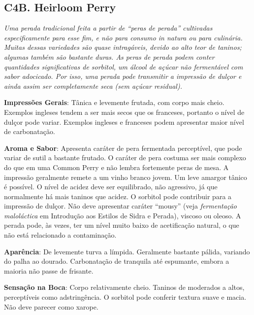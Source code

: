 \subsection*{C4B. Heirloom Perry}

\textit{Uma perada tradicional feita a partir de “peras de perada” cultivadas especificamente para esse fim, e não para consumo \textit{in natura} ou para culinária. Muitas dessas variedades são quase intragáveis, devido ao alto teor de taninos; algumas também são bastante duras. As peras de perada podem conter quantidades significativas de sorbitol, um álcool de açúcar não fermentável com sabor adocicado. Por isso, uma perada pode transmitir a impressão de dulçor e ainda assim ser completamente seca (sem açúcar residual).}

\textbf{Impressões Gerais}: Tânica e levemente frutada, com corpo mais cheio. Exemplos ingleses tendem a ser mais secos que os franceses, portanto o nível de dulçor pode variar. Exemplos ingleses e franceses podem apresentar maior nível de carbonatação.

\textbf{Aroma e Sabor}: Apresenta caráter de pera fermentada perceptível, que pode variar de sutil a bastante frutado. O caráter de pera costuma ser mais complexo do que em uma Common Perry e não lembra fortemente peras de mesa. A impressão geralmente remete a um vinho branco jovem. Um leve amargor tânico é possível. O nível de acidez deve ser equilibrado, não agressivo, já que normalmente há mais taninos que acidez. O sorbitol pode contribuir para a impressão de dulçor. Não deve apresentar caráter “mousy” (veja \textit{fermentação maloláctica} em Introdução aos Estilos de Sidra e Perada), viscoso ou oleoso. A perada pode, às vezes, ter um nível muito baixo de acetificação natural, o que não está relacionado a contaminação.

\textbf{Aparência}: De levemente turva a límpida. Geralmente bastante pálida, variando do palha ao dourado. Carbonatação de tranquila até espumante, embora a maioria não passe de frisante.

\textbf{Sensação na Boca}: Corpo relativamente cheio. Taninos de moderados a altos, perceptíveis como adstringência. O sorbitol pode conferir textura suave e macia. Não deve parecer como xarope.

